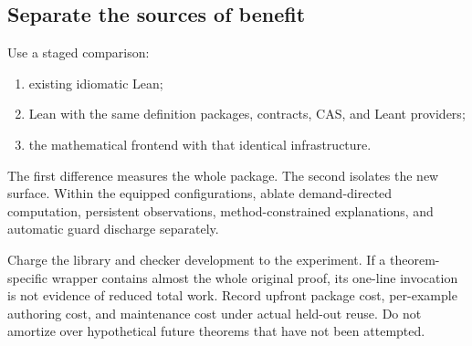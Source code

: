 \documentclass[11pt,a4paper]{article}
\theoremstyle{definition}
\begin{document}
\subsection{Separate the sources of benefit}
Use a staged comparison:
\begin{enumerate}
\item existing idiomatic Lean;
\item Lean with the same definition packages, contracts, CAS, and Leant providers;
\item the mathematical frontend with that identical infrastructure.
\end{enumerate}
The first difference measures the whole package. The second isolates the new surface. Within the equipped configurations, ablate demand-directed computation, persistent observations, method-constrained explanations, and automatic guard discharge separately.

Charge the library and checker development to the experiment. If a theorem-specific wrapper contains almost the whole original proof, its one-line invocation is not evidence of reduced total work. Record upfront package cost, per-example authoring cost, and maintenance cost under actual held-out reuse. Do not amortize over hypothetical future theorems that have not been attempted.
\end{document}
